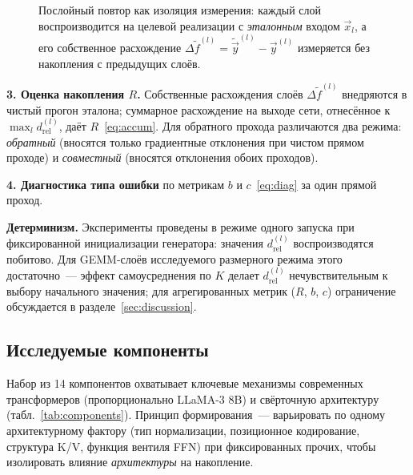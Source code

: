 \begin{figure}[htbp]
{}
\caption{Послойный повтор как изоляция измерения: каждый слой воспроизводится на
    целевой реализации с \emph{эталонным} входом $\Vec{x}_l$, а его собственное
    расхождение $\Delta\tilde f^{(l)}=\tilde{\Vec{y}}^{(l)}-\Vec{y}^{(l)}$
    измеряется без накопления с предыдущих слоёв.}
\label{fig:replay}
\end{figure}

\textbf{3. Оценка накопления $R$.} Собственные расхождения слоёв
$\Delta\tilde f^{(l)}$ внедряются в чистый прогон эталона; суммарное расхождение
на выходе сети, отнесённое к $\max_l d_{\text{rel}}^{(l)}$, даёт
$R$~\eqref{eq:accum}. Для обратного прохода различаются два режима: \emph{обратный}
(вносятся только градиентные отклонения при чистом прямом проходе) и
\emph{совместный} (вносятся отклонения обоих проходов).

\textbf{4. Диагностика типа ошибки} по метрикам $b$ и $c$~\eqref{eq:diag} за один
прямой проход.

\textbf{Детерминизм.} Эксперименты проведены в режиме одного запуска при
фиксированной инициализации генератора: значения $d_{\text{rel}}^{(l)}$
воспроизводятся побитово. Для GEMM-слоёв исследуемого размерного режима этого
достаточно~--- эффект самоусреднения по $K$ делает $d_{\text{rel}}^{(l)}$
нечувствительным к выбору начального значения; для агрегированных метрик ($R$,
$b$, $c$) ограничение обсуждается в разделе~\ref{sec:discussion}.

\subsection{Исследуемые компоненты}

Набор из 14 компонентов охватывает ключевые механизмы современных трансформеров
(пропорционально LLaMA-3 8B) и свёрточную архитектуру (табл.~\ref{tab:components}).
Принцип формирования~--- варьировать по одному архитектурному фактору (тип
нормализации, позиционное кодирование, структура K/V, функция вентиля FFN) при
фиксированных прочих, чтобы изолировать влияние \emph{архитектуры} на накопление.

